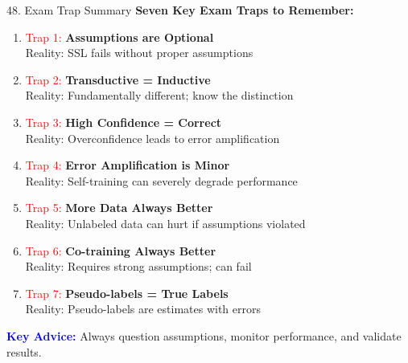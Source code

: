 \documentclass[8pt]{beamer}
\begin{document}
	\begin{frame}{48. Exam Trap Summary}
		\fontsize{6.5}{7.5}\selectfont
		\textbf{Seven Key Exam Traps to Remember:}
		
		\begin{enumerate}
			\item \textcolor{red}{Trap 1:} \textbf{Assumptions are Optional} \\
			\alert{Reality:} SSL fails without proper assumptions
			
			\item \textcolor{red}{Trap 2:} \textbf{Transductive = Inductive} \\
			\alert{Reality:} Fundamentally different; know the distinction
			
			\item \textcolor{red}{Trap 3:} \textbf{High Confidence = Correct} \\
			\alert{Reality:} Overconfidence leads to error amplification
			
			\item \textcolor{red}{Trap 4:} \textbf{Error Amplification is Minor} \\
			\alert{Reality:} Self-training can severely degrade performance
			
			\item \textcolor{red}{Trap 5:} \textbf{More Data Always Better} \\
			\alert{Reality:} Unlabeled data can hurt if assumptions violated
			
			\item \textcolor{red}{Trap 6:} \textbf{Co-training Always Better} \\
			\alert{Reality:} Requires strong assumptions; can fail
			
			\item \textcolor{red}{Trap 7:} \textbf{Pseudo-labels = True Labels} \\
			\alert{Reality:} Pseudo-labels are estimates with errors
		\end{enumerate}
		
		\textcolor{blue}{\textbf{Key Advice:}} Always question assumptions, monitor performance, and validate results.
	\end{frame}
	
	
\end{document}
